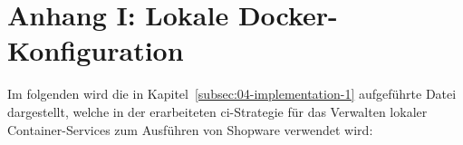 
\section{Anhang I: Lokale Docker-Konfiguration} \label{sec:appendix-1}

Im folgenden wird die in Kapitel\ \ref{subsec:04-implementation-1} aufgeführte Datei\ 
dargestellt, welche in der erarbeiteten \acrshort{ci}-Strategie für das Verwalten lokaler Container-Services zum
Ausführen von Shopware verwendet wird:


\clearpage
